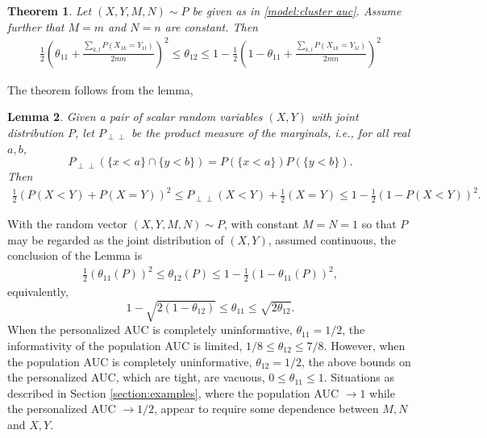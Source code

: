 \documentclass[12pt]{article}
\DeclareMathOperator{\AUC}{AUC}
\renewcommand{\P}{P}
\newcommand{\cind}{\perp \!\!\! \perp}
\newcommand{\aucindiv}{\theta_{11}}%
\newcommand{\aucpop}{\theta_{12}}%
\newtheorem{theorem}{Theorem}
\newtheorem{lemma}[theorem]{Lemma}
\begin{document}

\begin{theorem}\label{theorem:bounds}
  Let $(X,Y,M,N)\sim \P$ be given as in \eqref{model:cluster auc}. Assume
  further that $M=m$ and $N=n$ are constant. Then
  \begin{align}
    \frac{1}{2}\left(\aucindiv+\frac{\sum_{k,l}\P(X_{1k}=Y_{1l})}{2mn}\right)^2 \le \aucpop \le 1-\frac{1}{2}\left(1-\aucindiv+\frac{\sum_{k,l}\P(X_{1k}=Y_{1l})}{2mn}\right)^2
  \end{align}
\end{theorem}
\noindent The theorem follows from the lemma,
\begin{lemma}\label{lemma:bounds}  Given a pair of scalar random variables $(X,Y)$ with joint distribution $\P$, let $\P_{\cind}$ be the product measure of the marginals, i.e., for all real $a,b$,
  $$
  \P_{\cind}(\{x<a\}\cap\{y<b\})=\P(\{x<a\})\P(\{y<b\}).
  $$
  Then
  \begin{align}
    \frac{1}{2}(\P(X<Y)+\P(X=Y))^2 \le \P_{\cind}(X<Y)+\frac{1}{2}(X=Y)
    \le 1-\frac{1}{2}(1-\P(X<Y))^2.
  \end{align}
\end{lemma}

With the random vector $(X,Y,M,N) \sim \P$, with constant $M=N=1$ so that $\P$ may be regarded as the joint distribution of $(X,Y)$, assumed continuous, the conclusion of the Lemma is
\begin{align}
  \frac{1}{2}(\aucindiv(\P))^2 \le \aucpop(P)
  \le 1-\frac{1}{2}(1-\aucindiv(\P))^2,\label{eqn:lemma:bounds:conclusion}
\end{align}
equivalently,
\[
1-\sqrt{2(1-\aucpop)} \le \aucindiv \le \sqrt{2\aucpop}.
  \]
When the personalized AUC is completely uninformative, $\aucindiv=1/2$,
the informativity of the population AUC is limited,
$1/8 \le \aucpop \le 7/8$. However, when the population AUC is
completely uninformative, $\aucpop=1/2$, the above bounds on the personalized AUC, which are tight, are vacuous, $0\le\aucindiv\le 1$. Situations as described in Section \ref{section:examples}, where the population AUC $\to 1$ while the personalized AUC $\to 1/2$, appear to require some dependence between $M,N$ and $X,Y$. %
\end{document}
